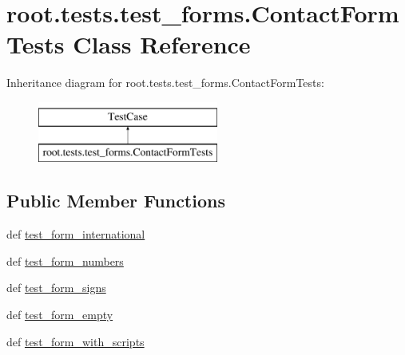 \hypertarget{classroot_1_1tests_1_1test__forms_1_1_contact_form_tests}{\section{root.\-tests.\-test\-\_\-forms.\-Contact\-Form\-Tests Class Reference}
\label{classroot_1_1tests_1_1test__forms_1_1_contact_form_tests}
}
Inheritance diagram for root.\-tests.\-test\-\_\-forms.\-Contact\-Form\-Tests\-:\begin{figure}[H]
\begin{center}
\leavevmode
\includegraphics[height=2.000000cm]{classroot_1_1tests_1_1test__forms_1_1_contact_form_tests}
\end{center}
\end{figure}
\subsection*{Public Member Functions}
\begin{DoxyCompactItemize}
\item 
def \hyperlink{classroot_1_1tests_1_1test__forms_1_1_contact_form_tests_aac5d48c32108d136e5853dbe058031fe}{test\-\_\-form\-\_\-international}
\item 
def \hyperlink{classroot_1_1tests_1_1test__forms_1_1_contact_form_tests_a91087bb8f275c6d3331dce18112b5851}{test\-\_\-form\-\_\-numbers}
\item 
def \hyperlink{classroot_1_1tests_1_1test__forms_1_1_contact_form_tests_a2e3de46dd4ded2ec8713ee03a122fb08}{test\-\_\-form\-\_\-signs}
\item 
def \hyperlink{classroot_1_1tests_1_1test__forms_1_1_contact_form_tests_a9076846054ccd53a22a304096f8a0e42}{test\-\_\-form\-\_\-empty}
\item 
def \hyperlink{classroot_1_1tests_1_1test__forms_1_1_contact_form_tests_a038f314296e401714b0175ef3fae3f97}{test\-\_\-form\-\_\-with\-\_\-scripts}
\end{DoxyCompactItemize}


